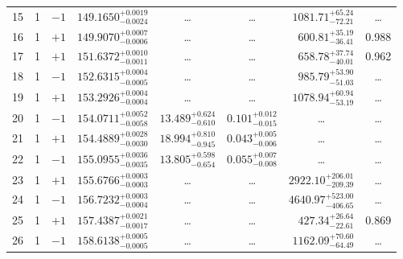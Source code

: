 \begin{table*}[!]
\begin{tabular}{llcrrlrc}
15 & 1 & $-1$ & $    149.1650_{-      0.0024}^{+      0.0019}$ & \multicolumn{1}{c}{\dots} & \multicolumn{1}{c}{\dots} & $     1081.71_{-       72.21}^{+       65.24}$ & \dots \\[1pt]
16 & 1 & $+1$ & $    149.9070_{-      0.0006}^{+      0.0007}$ & \multicolumn{1}{c}{\dots} & \multicolumn{1}{c}{\dots} & $      600.81_{-       36.41}^{+       35.19}$ & 0.988\\[1pt]
17 & 1 & $+1$ & $    151.6372_{-      0.0011}^{+      0.0010}$ & \multicolumn{1}{c}{\dots} & \multicolumn{1}{c}{\dots} & $      658.78_{-       40.01}^{+       37.74}$ & 0.962\\[1pt]
18 & 1 & $-1$ & $    152.6315_{-      0.0005}^{+      0.0004}$ & \multicolumn{1}{c}{\dots} & \multicolumn{1}{c}{\dots} & $      985.79_{-       51.03}^{+       53.90}$ & \dots \\[1pt]
19 & 1 & $+1$ & $    153.2926_{-      0.0004}^{+      0.0004}$ & \multicolumn{1}{c}{\dots} & \multicolumn{1}{c}{\dots} & $     1078.94_{-       53.19}^{+       60.94}$ & \dots \\[1pt]
20 & 1 & $-1$ & $    154.0711_{-      0.0058}^{+      0.0052}$ & $      13.489_{-       0.610}^{+       0.624}$ & $       0.101_{-       0.015}^{+       0.012}$ & \multicolumn{1}{c}{\dots} & \dots \\[1pt]
21 & 1 & $+1$ & $    154.4889_{-      0.0030}^{+      0.0028}$ & $      18.994_{-       0.945}^{+       0.810}$ & $       0.043_{-       0.006}^{+       0.005}$ & \multicolumn{1}{c}{\dots} & \dots \\[1pt]
22 & 1 & $-1$ & $    155.0955_{-      0.0035}^{+      0.0036}$ & $      13.805_{-       0.654}^{+       0.598}$ & $       0.055_{-       0.008}^{+       0.007}$ & \multicolumn{1}{c}{\dots} & \dots \\[1pt]
23 & 1 & $+1$ & $    155.6766_{-      0.0003}^{+      0.0003}$ & \multicolumn{1}{c}{\dots} & \multicolumn{1}{c}{\dots} & $     2922.10_{-      209.39}^{+      206.01}$ & \dots \\[1pt]
24 & 1 & $-1$ & $    156.7232_{-      0.0004}^{+      0.0003}$ & \multicolumn{1}{c}{\dots} & \multicolumn{1}{c}{\dots} & $     4640.97_{-      406.65}^{+      523.00}$ & \dots \\[1pt]
25 & 1 & $+1$ & $    157.4387_{-      0.0017}^{+      0.0021}$ & \multicolumn{1}{c}{\dots} & \multicolumn{1}{c}{\dots} & $      427.34_{-       22.61}^{+       26.64}$ & 0.869\\[1pt]
26 & 1 & $-1$ & $    158.6138_{-      0.0005}^{+      0.0005}$ & \multicolumn{1}{c}{\dots} & \multicolumn{1}{c}{\dots} & $     1162.09_{-       64.49}^{+       70.60}$ & \dots \\[1pt]


\end{tabular}
\end{table*}
